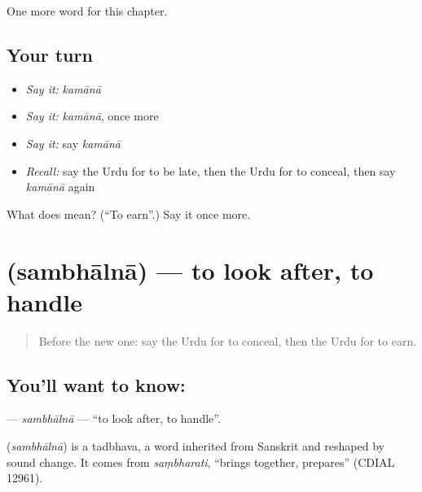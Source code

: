 \begin{grammarlens}[title={What you've built}]
One more word for this chapter.
\end{grammarlens}

\subsection*{Your turn}
\begin{itemize}
\raggedright
  \item \emph{Say it:} \emph{kamānā}
  \item \emph{Say it:} \emph{kamānā}, once more
  \item \emph{Say it:} say \emph{kamānā}
  \item \emph{Recall:} say the Urdu for to be late, then the Urdu for to conceal, then say \emph{kamānā} again
\end{itemize}

\begin{tcolorbox}[breakable,colback=teal!4,colframe=teal!35!black,title={Before you move on}]
What does  mean? (\textquotedblleft{}To earn\textquotedblright{}.) Say it once more.
\end{tcolorbox}
\section[\texorpdfstring{\ur{سنبھالنا} (sambhālnā)}{سنبھالنا (sambhālnā)}]{ (sambhālnā) — to look after, to handle}

\label{lesson:UR-C214-sambhalna}



\begin{quote}
Before the new one: say the Urdu for to conceal, then the Urdu for to earn.
\end{quote}

\subsection*{You'll want to know: }
\textbf{} — \emph{sambhālnā} — \textquotedblleft{}to look after, to handle\textquotedblright{}.

\begin{cousinweb}
\textbf{} (\emph{sambhālnā}) is a tadbhava, a word inherited from Sanskrit and reshaped by sound change. It comes from \emph{saṃbharati}, \textquotedblleft{}brings together, prepares\textquotedblright{} (CDIAL 12961).
\end{cousinweb}


